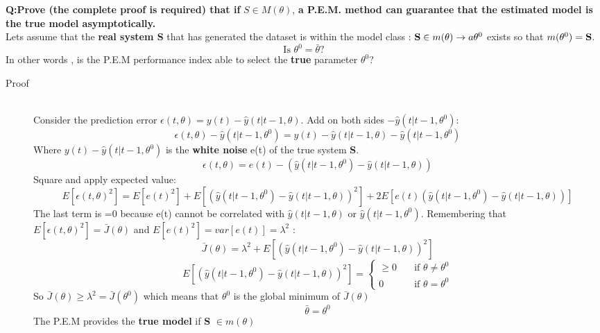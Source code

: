 \documentclass[12pt]{article} %
\begin{document}
\vspace{8mm}
\textbf{Q:Prove (the complete proof is required) that if }$S \in M(\theta)$, \textbf{a P.E.M.  method can guarantee that the estimated model is the true model asymptotically.}\vspace{2mm}\\
Lets assume that the \textbf{real system S} that has generated the dataset is within the model class : $ \text{\textbf{S}} \in m(\theta) \to a\theta ^0$  exists so that $ m(\theta^0) = \text{\textbf{S}}$.
$$ \text{Is } \theta^0 = \bar{\theta} \text{?}$$
In other words , is the P.E.M performance index able to select the \textbf{true} parameter $\theta^0$?
\begin{description}
\item[Proof]\hfill\\
Consider the prediction error $\epsilon(t,\theta) = y(t) - \hat{y}(t|t-1,\theta)$.
Add on both sides $ -\hat{y}(t|t-1,\theta^0)$:
$$ \epsilon(t,\theta) -\hat{y}(t|t-1,\theta^0) = y(t) - \hat{y}(t|t-1,\theta) -\hat{y}(t|t-1,\theta^0)$$
Where $y(t)-\hat{y}(t|t-1,\theta^0)$ is the \textbf{white noise} e(t) of the true system \textbf{S}.
$$ \epsilon(t,\theta)=e(t)-(\hat{y}(t|t-1,\theta^0)-\hat{y}(t|t-1,\theta))$$
Square and apply expected value:
$$ E[\epsilon(t,\theta)^2]=E[e(t)^2]+E[(\hat{y}(t|t-1,\theta^0)-\hat{y}(t|t-1,\theta))^2]+2E[e(t)(\hat{y}(t|t-1,\theta^0)-\hat{y}(t|t-1,\theta))]$$
The last term is =0 because e(t) cannot be correlated with $\hat{y}(t|t-1,\theta)$ or $\hat{y}(t|t-1,\theta^0)$. Remembering that $E[\epsilon(t,\theta)^2]= \bar{J}(\theta)$ and $E[e(t)^2]=var[e(t)] = \lambda^2$ :
$$ \bar{J}(\theta) = \lambda^2 + E[(\hat{y}(t|t-1,\theta^0)-\hat{y}(t|t-1,\theta))^2]$$
\[  E[(\hat{y}(t|t-1,\theta^0)-\hat{y}(t|t-1,\theta))^2]=
  \begin{cases}
    \geq 0       & \quad \text{if } \theta \neq \theta^0\\
   	 0  			 & \quad \text{if } \theta = \theta^0
  \end{cases}
\]
So $\bar{J}(\theta) \geq \lambda^2 = \bar{J}(\theta^0)$ which means that $\theta^0$ is the global minimum of $\bar{J}(\theta) $ $$ \bar{\theta} = \theta^0$$ The P.E.M provides the \textbf{true model} if \textbf{S} $\in m(\theta)$ 
\end{description}
\end{document}
